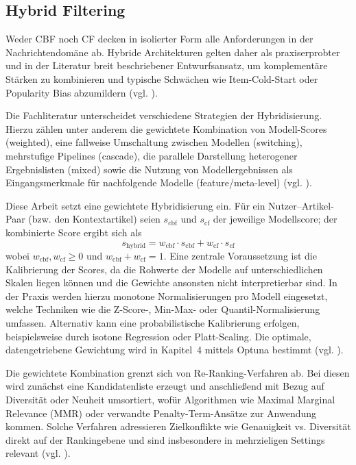 \subsection{Hybrid Filtering}
\label{sec:hybrid}
Weder \ac{CBF} noch \ac{CF} decken in isolierter Form alle Anforderungen in der Nachrichtendomäne ab. 
Hybride Architekturen gelten daher als praxiserprobter und in der Literatur breit beschriebener Entwurfsansatz, 
um komplementäre Stärken zu kombinieren und typische Schwächen wie Item-Cold-Start oder Popularity Bias abzumildern 
(vgl. \cite{burke_hybrid_2002,wu_personalized_2022,raza_news_2020}).

Die Fachliteratur unterscheidet verschiedene Strategien der Hybridisierung. Hierzu zählen unter anderem die 
gewichtete Kombination von Modell-Scores (weighted), eine fallweise Umschaltung zwischen Modellen (switching), 
mehrstufige Pipelines (cascade), die parallele Darstellung heterogener Ergebnislisten (mixed) sowie die 
Nutzung von Modellergebnissen als Eingangsmerkmale für nachfolgende Modelle (feature/meta-level) 
(vgl. \cite{burke_hybrid_2002}).

Diese Arbeit setzt eine gewichtete Hybridisierung ein. Für ein Nutzer–Artikel-Paar (bzw. den Kontextartikel) 
seien $s_\mathrm{cbf}$ und $s_\mathrm{cf}$ der jeweilige Modellscore; der kombinierte Score ergibt sich als
\begin{equation}
\label{eq:target}
s_\mathrm{hybrid} = w_\mathrm{cbf} \cdot s_\mathrm{cbf} + w_\mathrm{cf} \cdot s_\mathrm{cf}
\end{equation}
wobei $w_\mathrm{cbf}, w_\mathrm{cf} \geq 0$ und $w_\mathrm{cbf} + w_\mathrm{cf} = 1$. Eine zentrale Voraussetzung ist die Kalibrierung 
der Scores, da die Rohwerte der Modelle auf unterschiedlichen Skalen liegen können und die Gewichte ansonsten nicht 
interpretierbar sind. In der Praxis werden hierzu monotone Normalisierungen pro Modell eingesetzt, welche Techniken 
wie die Z-Score-, Min-Max- oder Quantil-Normalisierung umfassen. Alternativ kann eine probabilistische 
Kalibrierung erfolgen, beispielsweise durch isotone Regression oder Platt-Scaling. Die optimale, datengetriebene 
Gewichtung wird in Kapitel~4 mittels Optuna bestimmt (vgl. \cite{Akiba_Optuna_2019}).

Die gewichtete Kombination grenzt sich von Re-Ranking-Verfahren ab. Bei diesen wird zunächst eine 
Kandidatenliste erzeugt und anschließend mit Bezug auf Diversität oder Neuheit umsortiert, wofür Algorithmen wie 
Maximal Marginal Relevance (MMR) oder verwandte Penalty-Term-Ansätze zur Anwendung kommen. Solche Verfahren 
adressieren Zielkonflikte wie Genauigkeit vs. Diversität direkt auf der Rankingebene und sind insbesondere 
in mehrzieligen Settings relevant (vgl. \cite{jannach_survey_2023,Carbonell_mmr_1998}).

